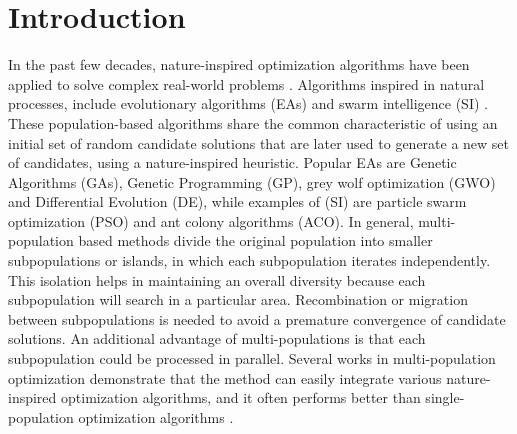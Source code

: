 \documentclass[runningheads]{llncs}
\begin{document}
\section{Introduction}

In the past few decades, nature-inspired optimization algorithms have been
applied to solve complex real-world problems \cite{yang2014nature}. Algorithms
inspired in natural processes,  include evolutionary algorithms (EAs)
\cite{back1996evolutionary} and swarm intelligence (SI) \cite{kennedy2006swarm}.
These population-based algorithms share the common characteristic of using an initial set of
random candidate solutions that are later used to generate a new set of
candidates, using a nature-inspired heuristic.
Popular EAs are Genetic Algorithms (GAs), Genetic Programming (GP), 
grey wolf optimization (GWO) and Differential Evolution (DE), 
while examples of (SI) are particle swarm optimization (PSO) and
ant colony algorithms (ACO).
%   
In general, multi-population based methods divide the original
population into smaller subpopulations or islands, in which each subpopulation
iterates independently. This isolation helps in maintaining an overall diversity
because each subpopulation will search in a particular area. Recombination or
migration between subpopulations is needed to avoid a premature convergence of
candidate solutions. An additional advantage of multi-populations is that each
subpopulation could be processed in parallel. Several works in multi-population
optimization demonstrate that the method can easily
integrate various nature-inspired optimization algorithms, and it often performs
better than single-population optimization algorithms 
\cite{wu2016differential,nseef2016adaptive}.
\end{document}
